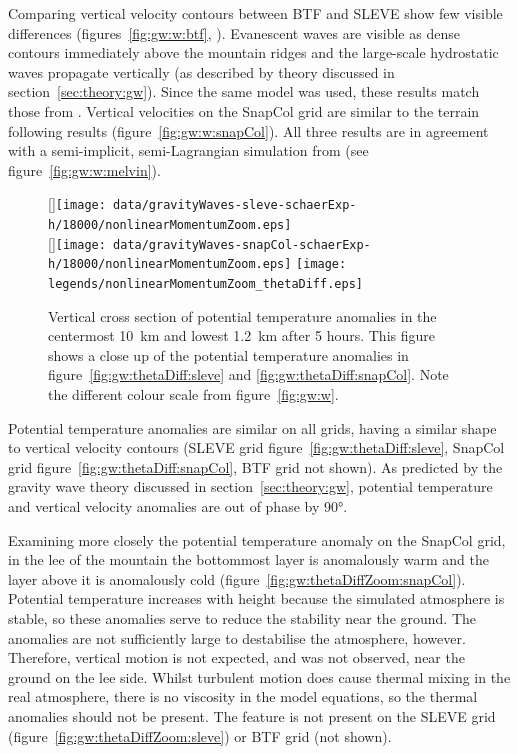 Comparing vertical velocity contours between BTF and SLEVE show few visible differences (figures~\ref{fig:gw:w:btf}, ).  Evanescent waves are visible as dense contours immediately above the mountain ridges and the large-scale hydrostatic waves propagate vertically (as described by theory discussed in section~\ref{sec:theory:gw}).  Since the same model was used, these results match those from \textcite{weller-shahrokhi2014}.  Vertical velocities on the SnapCol grid are similar to the terrain following results (figure~\ref{fig:gw:w:snapCol}).  All three results are in agreement with a semi-implicit, semi-Lagrangian simulation from \textcite{melvin2010} (see figure~\ref{fig:gw:w:melvin}).

\begin{figure}
	\captionsetup[subfigure]{position=b}
	\centering
	[\textwidth]{\texttt{[image: data/gravityWaves-sleve-schaerExp-h/18000/nonlinearMomentumZoom.eps]}} \\
	[\textwidth]{\texttt{[image: data/gravityWaves-snapCol-schaerExp-h/18000/nonlinearMomentumZoom.eps]}}
%
	\texttt{[image: legends/nonlinearMomentumZoom\_thetaDiff.eps]}
	\caption{Vertical cross section of potential temperature anomalies in the centermost \SI{10}{\kilo\meter} and lowest \SI{1.2}{\kilo\meter} after 5 hours.  This figure shows a close up of the potential temperature anomalies in figure~\ref{fig:gw:thetaDiff:sleve} and \ref{fig:gw:thetaDiff:snapCol}.  Note the different colour scale from figure~\ref{fig:gw:w}.}
	\label{fig:gw:thetaDiffZoom}
\end{figure}

Potential temperature anomalies are similar on all grids, having a similar shape to vertical velocity contours (SLEVE grid figure~\ref{fig:gw:thetaDiff:sleve}, SnapCol grid figure~\ref{fig:gw:thetaDiff:snapCol}, BTF grid not shown).  As predicted by the gravity wave theory discussed in section~\ref{sec:theory:gw}, potential temperature and vertical velocity anomalies are out of phase by \ang{90}.

Examining more closely the potential temperature anomaly on the SnapCol grid, in the lee of the mountain the bottommost layer is anomalously warm and the layer above it is anomalously cold (figure~\ref{fig:gw:thetaDiffZoom:snapCol}).  Potential temperature increases with height because the simulated atmosphere is stable, so these anomalies serve to reduce the stability near the ground.  The anomalies are not sufficiently large to destabilise the atmosphere, however.   Therefore, vertical motion is not expected, and was not observed, near the ground on the lee side.   Whilst turbulent motion does cause thermal mixing in the real atmosphere, there is no viscosity in the model equations, so the thermal anomalies should not be present.  The feature is not present on the SLEVE grid (figure~\ref{fig:gw:thetaDiffZoom:sleve}) or BTF grid (not shown).

